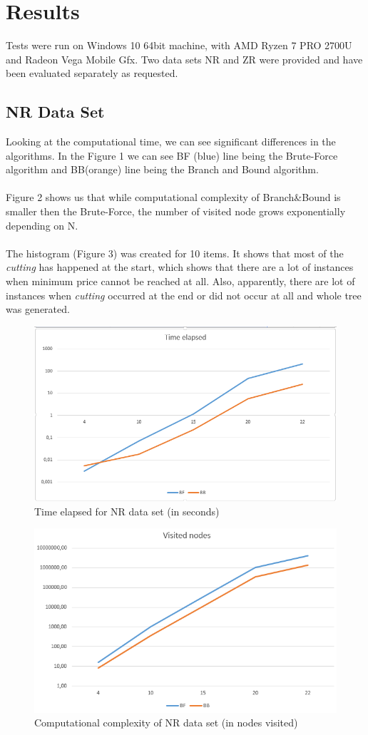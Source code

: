 \documentclass{article}
\begin{document}
\section{Results}
Tests were run on Windows 10 64bit machine, with AMD Ryzen 7 PRO 2700U and Radeon Vega Mobile Gfx. Two data sets NR and ZR were provided and have been evaluated separately as requested.

\subsection{NR Data Set}
Looking at the computational time, we can see significant differences in the algorithms. In the Figure 1 we can see BF (blue) line being the Brute-Force algorithm and BB(orange) line being the Branch and Bound algorithm.
\\
\\
Figure 2 shows us that while computational complexity of Branch\&Bound is smaller then the Brute-Force, the number of visited node grows exponentially depending on N. 
\\
\\
The histogram (Figure 3) was created for 10 items. It shows that most of the \textit{cutting} has happened at the start, which shows that there are a lot of instances when minimum price cannot be reached at all. Also, apparently, there are lot of instances when \textit{cutting} occurred at the end or did not occur at all and whole tree was generated.
\begin{figure}[H]
    \centering
    \includegraphics[width=0.8\linewidth]{NRtime.PNG}
    \caption{Time elapsed for NR data set (in seconds)}
\end{figure}
\begin{figure}[H]
    \centering
    \includegraphics[width=0.8\linewidth]{NRpass.PNG}
    \caption{Computational complexity of NR data set (in nodes visited)}
\end{figure}
\end{document}

